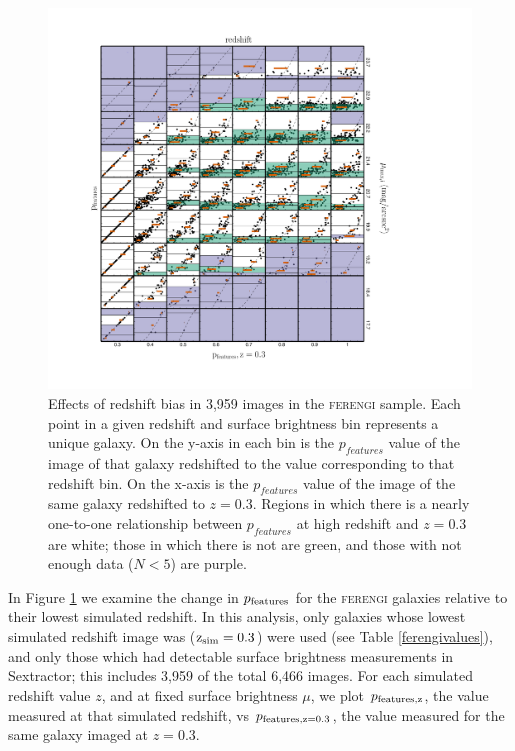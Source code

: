 \documentclass[usenatbib]{mn2e}
\newcommand{\ferengi}{\textsc{ferengi}}
\begin{document}
\begin{figure}
\begin{center}
\includegraphics[width=\textwidth]{figures/p_vs_p_SB_redshift.pdf}
\caption{Effects of redshift bias in 3,959 images in the \ferengi{} sample. Each point in a given redshift and surface brightness bin represents a unique galaxy. On the y-axis in each bin is the $p_{features}$ value of the image of that galaxy redshifted to the value corresponding to that redshift bin. On the x-axis is the $p_{features}$ value of the image of the same galaxy redshifted to $z=0.3$. Regions in which there is a nearly one-to-one relationship between $p_{features}$ at high redshift and $z=0.3$ are white; those in which there is not are green, and those with not enough data ($N<5$) are purple. }
\label{fig:p_vs_p}
\end{center}
\end{figure}

In Figure \ref{fig:p_vs_p} we examine the change in $p_{\rm features}$ for the \ferengi{} galaxies relative to their lowest simulated redshift. In this analysis, only galaxies whose lowest simulated redshift image was ($\rm z_{sim}=0.3$) were used (see Table \ref{ferengivalues}), and only those which had detectable surface brightness measurements in Sextractor; this includes 3,959 of the total 6,466 images. For each simulated redshift value $z$, and at fixed surface brightness $\mu$, we plot $p_{\rm features,z}$, the value measured at that simulated redshift, vs $p_{\rm features,z=0.3}$, the value measured for the same galaxy imaged at $z=0.3$. 
 
\end{document}
